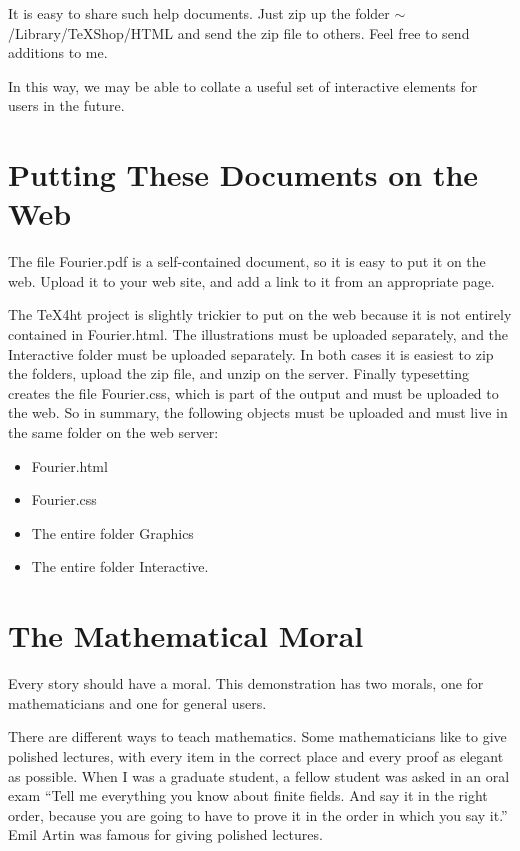 \documentclass[11pt, oneside]{article}   	%
\begin{document}
It is easy to share such help documents. Just zip up the folder $\sim$/Library/TeXShop/HTML and send the zip file to others. Feel free to send additions to me.

In this way, we may be able to collate a useful set of interactive elements for users in the future. 

\section{Putting These Documents on the Web}

The file Fourier.pdf is a self-contained document, so it is easy to put it on the web. Upload it to your web site, and add a link to it from an appropriate page. 

The TeX4ht project is slightly trickier to put on the web because it is not entirely contained in Fourier.html. The illustrations must be uploaded separately, and the Interactive folder must be uploaded separately. In both cases it is easiest to zip the folders, upload the zip file, and unzip on the server. Finally typesetting creates the file Fourier.css, which is part of the output and must  be uploaded to the web. So in summary, the following objects must be uploaded and must live in the same folder on the web server:
\begin{itemize}
\item Fourier.html
\item Fourier.css
\item The entire folder Graphics
\item The entire folder Interactive.
\end{itemize}

\section{The Mathematical Moral}

Every story should have a moral. This demonstration has two morals, one for mathematicians and one for general users. 

There are different ways to teach mathematics. Some mathematicians like to give  polished lectures, with every item in the correct place and every proof as elegant as possible.  When I was a graduate student, a fellow student was asked in an oral exam ``Tell me everything you know about finite fields. And say it in the right order, because you are going to have to prove it in the order in which you say it.'' Emil Artin was famous for giving polished lectures.
\end{document}
